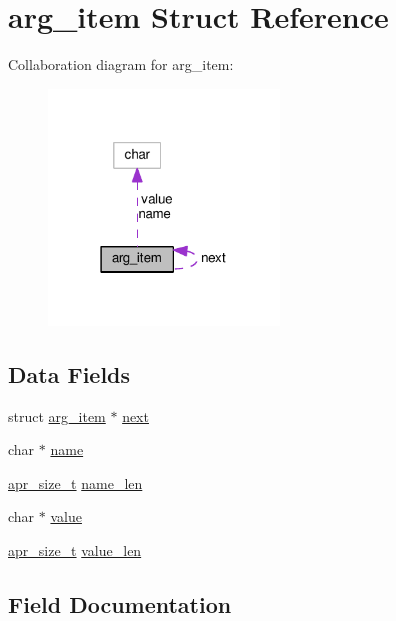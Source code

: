 \hypertarget{structarg__item}{}\section{arg\+\_\+item Struct Reference}
\label{structarg__item}


Collaboration diagram for arg\+\_\+item\+:
\nopagebreak
\begin{figure}[H]
\begin{center}
\leavevmode
\includegraphics[width=174pt]{structarg__item__coll__graph}
\end{center}
\end{figure}
\subsection*{Data Fields}
\begin{DoxyCompactItemize}
\item 
struct \hyperlink{structarg__item}{arg\+\_\+item} $\ast$ \hyperlink{structarg__item_a5c4faef478d2a62c97c2e4ac82e5af2c}{next}
\item 
char $\ast$ \hyperlink{structarg__item_ad342f3bd7e8cf5b3068deb4c616bbb94}{name}
\item 
\hyperlink{group__apr__platform_gaaa72b2253f6f3032cefea5712a27540e}{apr\+\_\+size\+\_\+t} \hyperlink{structarg__item_a58ba208cec3dc2a01b2357a399202073}{name\+\_\+len}
\item 
char $\ast$ \hyperlink{structarg__item_a43c9561a40f2b6441e8de2a62b06b293}{value}
\item 
\hyperlink{group__apr__platform_gaaa72b2253f6f3032cefea5712a27540e}{apr\+\_\+size\+\_\+t} \hyperlink{structarg__item_a862487e974ef750e221784a8c5c4e103}{value\+\_\+len}
\end{DoxyCompactItemize}


\subsection{Field Documentation}
